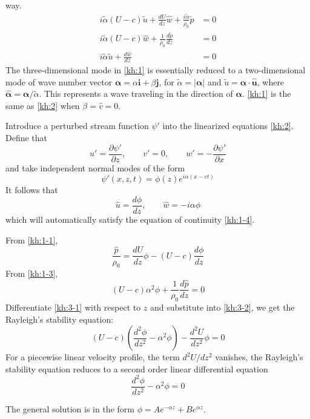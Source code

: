 way.
\begin{subequations}\label{kh:2}
\begin{align}
i\tilde{\alpha}(U-c)\tilde{u}+\frac{dU}{dz}\hat{w}+\frac{i\tilde{\alpha}}{\rho_0}\tilde{p}&=0\label{kh:2-1}\\
i\tilde{\alpha}(U-c)\hat{w}+\frac{1}{\rho_0}\frac{d\tilde{p}}{dz}&=0\label{kh:2-2}\\
i\tilde{\alpha}\tilde{u}+\frac{d\hat{w}}{dz}&=0\label{kh:2-3}
\end{align}
\end{subequations}
The three-dimensional mode in \eqref{kh:1} is essentially reduced to
a two-dimensional mode of wave number vector
$\boldsymbol{\alpha}=\alpha\mathbf{i}+\beta\mathbf{j}$, for
$\tilde{\alpha}=\lvert\boldsymbol{\alpha}\rvert$ and
$\tilde{u}=\hat{\boldsymbol{\alpha}}\cdot\hat{\mathbf{u}}$, where
$\hat{\boldsymbol{\alpha}}=\boldsymbol{\alpha}/\tilde{\alpha}$. This
represents a wave traveling in the direction of
$\boldsymbol{\alpha}$. \eqref{kh:1} is the same as \eqref{kh:2} when
$\beta=\hat{v}=0$.

Introduce a perturbed stream function $\psi'$ into the linearized
equations \eqref{kh:2}. Define that
\begin{equation}\label{kh:str1}
    u'=\frac{\partial\psi'}{\partial z},\qquad v'=0,\qquad w'=-\frac{\partial\psi'}{\partial x}
\end{equation}
and take independent normal modes of the form
\begin{equation}\label{kh:modes2}
    \psi'(x,z,t)=\phi(z)e^{i\alpha(x-ct)}
\end{equation}
It follows that
\begin{equation}\label{kh:str2}
    \hat{u}=\frac{d\phi}{dz},\qquad \hat{w}=-i\alpha\phi
\end{equation}
which will automatically satisfy the equation of continuity
\eqref{kh:1-4}.

From \eqref{kh:1-1},
\begin{equation}\label{kh:3-1}
    \frac{\hat{p}}{\rho_0}=\frac{dU}{dz}\phi-(U-c)\frac{d\phi}{dz}
\end{equation}
From \eqref{kh:1-3},
\begin{equation}\label{kh:3-2}
    (U-c)\alpha^2\phi+\frac{1}{\rho_0}\frac{d\hat{p}}{dz}=0
\end{equation}
Differentiate \eqref{kh:3-1} with respect to $z$ and substitute into
\eqref{kh:3-2}, we get the Rayleigh's stability equation:
\begin{equation}\label{kh:ray}
    \boxed{(U-c)(\frac{d^2\phi}{dz^2}-\alpha^2\phi)-\frac{d^2U}{dz^2}\phi=0}
\end{equation}
For a piecewise linear velocity profile, the term $d^2U/dz^2$
vanishes, the Rayleigh's stability equation reduces to a second
order linear differential equation
\begin{equation}\label{kh:ray2}
    \frac{d^2\phi}{dz^2}-\alpha^2\phi=0
\end{equation}

The general solution is in the form $\phi = Ae^{-\alpha
z}+Be^{\alpha z}$.
